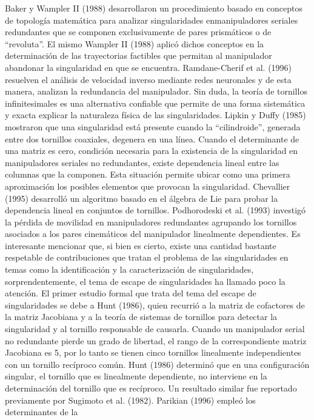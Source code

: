 \documentclass[12pt,a4paper]{article}
\begin{document}
Baker y Wampler II (1988) desarrollaron un procedimiento basado en conceptos de topología
matemática para analizar singularidades enmanipuladores seriales redundantes que se componen exclusivamente de pares prismáticos o de
“revoluta”. El mismo Wampler II (1988) aplicó
dichos conceptos en la determinación de las
trayectorias factibles que permitan al manipulador abandonar la singularidad en que se
encuentra. Ramdane-Cherif et al. (1996) resuelven el análisis de velocidad inverso mediante
redes neuronales y de esta manera, analizan la
redundancia del manipulador.
Sin duda, la teoría de tornillos infinitesimales es
una alternativa confiable que permite de una
forma sistemática y exacta explicar la naturaleza
física de las singularidades.
Lipkin y Duffy (1985) mostraron que una singularidad está presente cuando la “cilindroide”,
generada entre dos tornillos coaxiales, degenera
en una línea.
Cuando el determinante de una matriz es cero,
condición necesaria para la existencia de la singularidad en manipuladores seriales no redundantes, existe dependencia lineal entre las
columnas que la componen. Esta situación permite ubicar como una primera aproximación
los posibles elementos que provocan la singularidad. Chevallier (1995) desarrolló un algoritmo basado en el álgebra de Lie para probar la
dependencia lineal en conjuntos de tornillos.
Podhorodeski et al. (1993) investigó la pérdida
de movilidad en manipuladores redundantes
agrupando los tornillos asociados a los pares
cinemáticos del manipulador linealmente
dependientes.
Es interesante mencionar que, si bien es cierto,
existe una cantidad bastante respetable de contribuciones que tratan el problema de las singularidades en temas como la identificación y la
caracterización de singularidades, sorprendentemente, el tema de escape de singularidades ha
llamado poco la atención.
El primer estudio formal que trata del tema del
escape de singularidades se debe a Hunt (1986),
quien recurrió a la matriz de cofactores de la
matriz Jacobiana y a la teoría de sistemas de tornillos para detectar la singularidad y al tornillo responsable de causarla. Cuando un manipulador serial no redundante pierde un grado de libertad, el rango de la correspondiente matriz
Jacobiana es 5, por lo tanto se tienen cinco
tornillos linealmente independientes con un
tornillo recíproco común. Hunt (1986) determinó
que en una configuración singular, el tornillo que
es linealmente dependiente, no interviene en la
determinación del tornillo que es recíproco. Un
resultado similar fue reportado previamente por
Sugimoto et al. (1982).
Parikian (1996) empleó los determinantes de la
\end{document}
